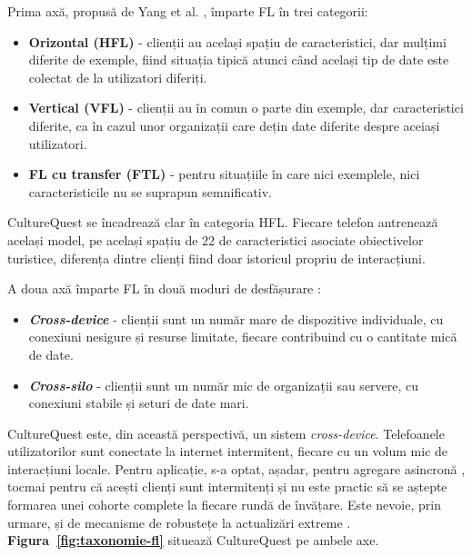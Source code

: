 \documentclass[12pt,a4paper]{report}
\begin{document}
Prima axă, propusă de Yang et al. \cite{yang2019fml}, împarte FL în trei categorii:

\begin{itemize}
  \item \textbf{Orizontal (HFL)} - clienții au același spațiu de caracteristici, dar mulțimi diferite de exemple, fiind situația tipică atunci când același tip de date este colectat de la utilizatori diferiți.
  \item \textbf{Vertical (VFL)} - clienții au în comun o parte din exemple, dar caracteristici diferite, ca în cazul unor organizații care dețin date diferite despre aceiași utilizatori.
  \item \textbf{FL cu transfer (FTL)} - pentru situațiile în care nici exemplele, nici caracteristicile nu se suprapun semnificativ.
\end{itemize}

CultureQuest se încadrează clar în categoria HFL. Fiecare telefon antrenează același model, pe același spațiu de 22 de caracteristici asociate obiectivelor turistice, diferența dintre clienți fiind doar istoricul propriu de interacțiuni.

A doua axă împarte FL în două moduri de desfășurare \cite{kairouz2021advances, li2020challenges}:

\begin{itemize}
  \item \textbf{\textit{Cross-device}} - clienții sunt un număr mare de dispozitive individuale, cu conexiuni nesigure și resurse limitate, fiecare contribuind cu o cantitate mică de date.
  \item \textbf{\textit{Cross-silo}} - clienții sunt un număr mic de organizații sau servere, cu conexiuni stabile și seturi de date mari.
\end{itemize}

CultureQuest este, din această perspectivă, un sistem \textit{cross-device}. Telefoanele utilizatorilor sunt conectate la internet intermitent, fiecare cu un volum mic de interacțiuni locale. Pentru aplicație, s-a optat, așadar, pentru agregare asincronă \cite{xie2019fedasync}, tocmai pentru că acești clienți sunt intermitenți și nu este practic să se aștepte formarea unei cohorte complete la fiecare rundă de învățare. Este nevoie, prin urmare, și de mecanisme de robustețe la actualizări extreme \cite{lyu2020threats}. \textbf{Figura~\ref{fig:taxonomie-fl}} situează CultureQuest pe ambele axe.
\end{document}
